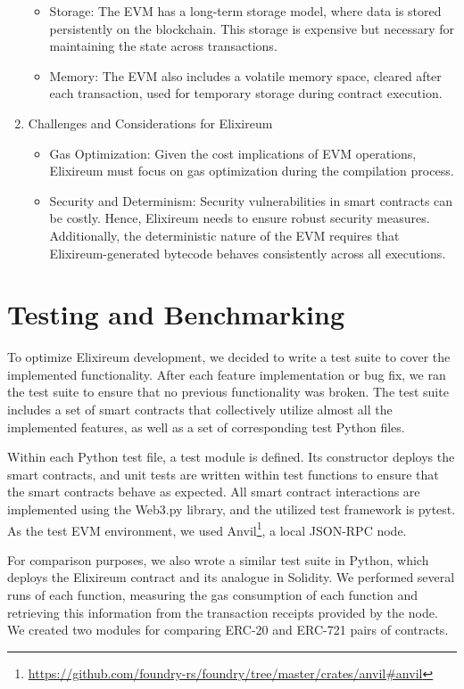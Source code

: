 \begin{enumerate}
          \begin{itemize}
              \item   Storage: The EVM has a long-term storage model, where data is stored persistently on the blockchain. This storage is expensive but necessary for maintaining the state across transactions.
              \item         Memory: The EVM also includes a volatile memory space, cleared after each transaction, used for temporary storage during contract execution.
          \end{itemize}
    \item Challenges and Considerations for Elixireum
          \begin{itemize}
              \item Gas Optimization: Given the cost implications of EVM operations, Elixireum must focus on gas optimization during the compilation process.
              \item Security and Determinism: Security vulnerabilities in smart contracts can be costly. Hence, Elixireum needs to ensure robust security measures. Additionally, the deterministic nature of the EVM requires that Elixireum-generated bytecode behaves consistently across all executions.
          \end{itemize}



\end{enumerate}

\section{Testing and Benchmarking}
\label{sec:test_suite}

To optimize Elixireum development, we decided to write a test suite to cover the implemented functionality. After each feature implementation or bug fix, we ran the test suite to ensure that no previous functionality was broken. The test suite includes a set of smart contracts that collectively utilize almost all the implemented features, as well as a set of corresponding test Python files.

Within each Python test file, a test module is defined. Its constructor deploys the smart contracts, and unit tests are written within test functions to ensure that the smart contracts behave as expected. All smart contract interactions are implemented using the Web3.py library, and the utilized test framework is pytest. As the test EVM environment, we used Anvil\footnote{\url{https://github.com/foundry-rs/foundry/tree/master/crates/anvil\#anvil}}, a local JSON-RPC node.

For comparison purposes, we also wrote a similar test suite in Python, which deploys the Elixireum contract and its analogue in Solidity. We performed several runs of each function, measuring the gas consumption of each function and retrieving this information from the transaction receipts provided by the node. We created two modules for comparing ERC-20 and ERC-721 pairs of contracts.
